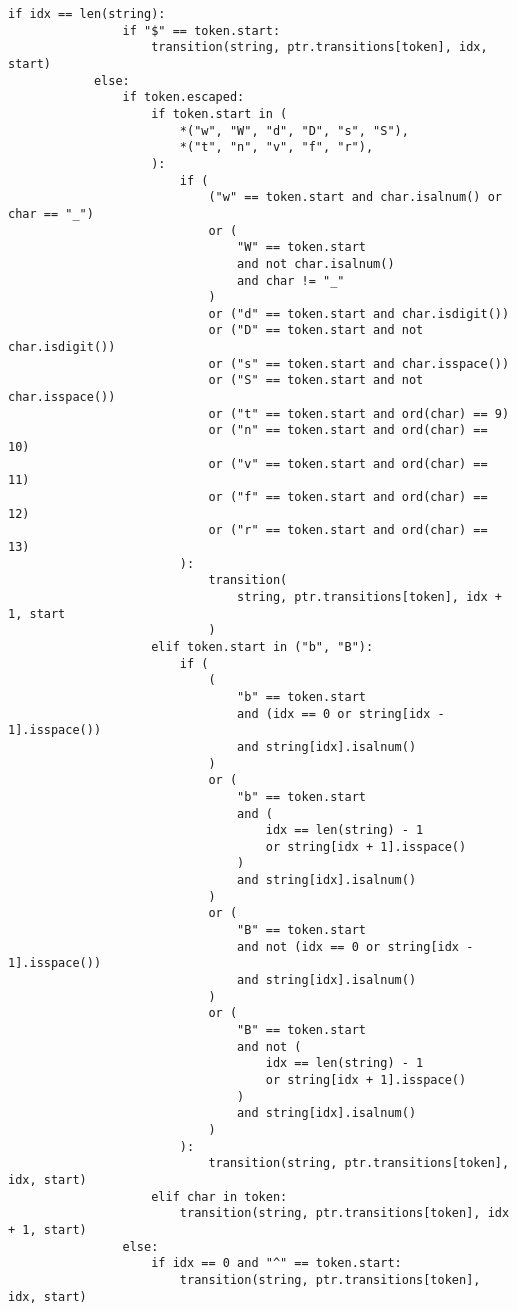 \documentclass[12pt]{report}
\begin{document}
\begin{itemize}
\begin{lstlisting}[caption={\texttt{FSM.match}}]
            if idx == len(string):
                if "$" == token.start:
                    transition(string, ptr.transitions[token], idx, start)
            else:
                if token.escaped:
                    if token.start in (
                        *("w", "W", "d", "D", "s", "S"),
                        *("t", "n", "v", "f", "r"),
                    ):
                        if (
                            ("w" == token.start and char.isalnum() or char == "_")
                            or (
                                "W" == token.start
                                and not char.isalnum()
                                and char != "_"
                            )
                            or ("d" == token.start and char.isdigit())
                            or ("D" == token.start and not char.isdigit())
                            or ("s" == token.start and char.isspace())
                            or ("S" == token.start and not char.isspace())
                            or ("t" == token.start and ord(char) == 9)
                            or ("n" == token.start and ord(char) == 10)
                            or ("v" == token.start and ord(char) == 11)
                            or ("f" == token.start and ord(char) == 12)
                            or ("r" == token.start and ord(char) == 13)
                        ):
                            transition(
                                string, ptr.transitions[token], idx + 1, start
                            )
                    elif token.start in ("b", "B"):
                        if (
                            (
                                "b" == token.start
                                and (idx == 0 or string[idx - 1].isspace())
                                and string[idx].isalnum()
                            )
                            or (
                                "b" == token.start
                                and (
                                    idx == len(string) - 1
                                    or string[idx + 1].isspace()
                                )
                                and string[idx].isalnum()
                            )
                            or (
                                "B" == token.start
                                and not (idx == 0 or string[idx - 1].isspace())
                                and string[idx].isalnum()
                            )
                            or (
                                "B" == token.start
                                and not (
                                    idx == len(string) - 1
                                    or string[idx + 1].isspace()
                                )
                                and string[idx].isalnum()
                            )
                        ):
                            transition(string, ptr.transitions[token], idx, start)
                    elif char in token:
                        transition(string, ptr.transitions[token], idx + 1, start)
                else:
                    if idx == 0 and "^" == token.start:
                        transition(string, ptr.transitions[token], idx, start)


\end{lstlisting}
\end{itemize}
\end{document}
